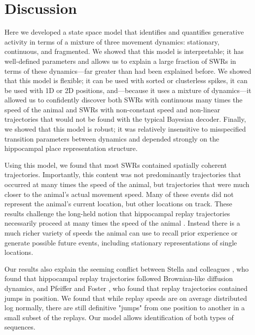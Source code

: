 \documentclass[times, twoside]{zHenriquesLab-StyleBioRxiv}
\begin{document}
\section*{Discussion}
Here we developed a state space model that identifies and quantifies generative activity in terms of a mixture of three movement dynamics: stationary, continuous, and fragmented. We showed that this model is interpretable; it has well-defined parameters and allows us to explain a large fraction of SWRs in terms of these dynamics---far greater than had been explained before. We showed that this model is flexible; it can be used with sorted or clusterless spikes, it can be used with 1D or 2D positions, and---because it uses a mixture of dynamics---it allowed us to confidently discover both SWRs with continuous many times the speed of the animal and SWRs with non-constant speed and non-linear trajectories that would not be found with the typical Bayesian decoder. Finally, we showed that this model is robust; it was relatively insensitive to misspecified transition parameters between dynamics and depended strongly on the hippocampal place representation structure.

Using this model, we found that most SWRs contained spatially coherent trajectories. Importantly, this content was not predominantly trajectories that occurred at many times the speed of the animal, but trajectories that were much closer to the animal's actual movement speed. Many of these events did not represent the animal's current location, but other locations on track. These results challenge the long-held notion that hippocampal replay trajectories necessarily proceed at many times the speed of the animal \cite{NadasdyReplayTimeCompression1999, LeeMemorySequentialExperience2002, DavidsonHippocampalReplayExtended2009}. Instead there is a much richer variety of speeds the animal can use to recall prior experience or generate possible future events, including stationary representations of single locations.

Our results also explain the seeming conflict between Stella and colleagues \cite{StellaHippocampalReactivationRandom2019}, who found that hippocampal replay trajectories followed Brownian-like diffusion dynamics, and Pfeiffer and Foster \cite{PfeifferAutoassociativedynamicsgeneration2015}, who found that replay trajectories contained jumps in position. We found that while replay speeds are on average distributed log normally, there are still definitive "jumps" from one position to another in a small subset of the replays. Our model allows identification of both types of sequences.
\end{document}
